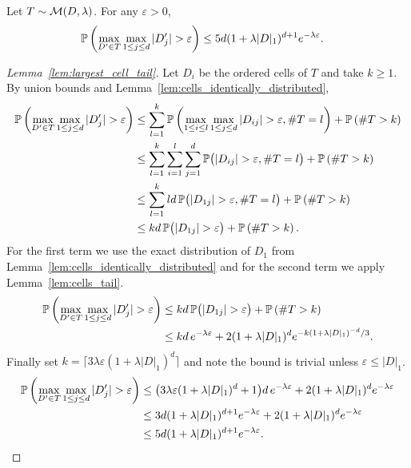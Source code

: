 \begin{lemma}
  \label{lem:largest_cell_tail}

  Let $T \sim \cM(D, \lambda)$.
  For any $\varepsilon > 0$,
  \begin{align*}
    \P\left(
      \max_{D' \in T}
      \max_{1 \leq j \leq d}
      |D'_j| > \varepsilon
    \right)
    &\leq
    5d (1 + \lambda |D|_1)^{d+1}
    e^{-\lambda \varepsilon}.
  \end{align*}
\end{lemma}

\begin{proof}[Lemma~\ref{lem:largest_cell_tail}]

  Let $D_i$ be the ordered cells of $T$ and take $k \geq 1$.
  By union bounds and Lemma~\ref{lem:cells_identically_distributed},
  \begin{align*}
    \P\left(
      \max_{D' \in T}
      \max_{1 \leq j \leq d}
      |D'_j| > \varepsilon
    \right)
    &\leq
    \sum_{l=1}^k
    \P\left(
      \max_{1 \leq i \leq l}
      \max_{1 \leq j \leq d}
      |D_{i j}| > \varepsilon,
      \# T = l
    \right)
    + \P\left( \# T > k \right) \\
    &\leq
    \sum_{l=1}^k
    \sum_{i=1}^l
    \sum_{j=1}^d
    \P\big(
      |D_{i j}| > \varepsilon,
      \# T = l
    \big)
    + \P\left( \# T > k \right) \\
    &\leq
    \sum_{l=1}^k
    l d \,
    \P\big(
      |D_{1j}| > \varepsilon,
      \# T = l
    \big)
    + \P\left( \# T > k \right) \\
    &\leq
    k d \,
    \P\big(|D_{1 j}| > \varepsilon \big)
    + \P\left( \# T > k \right).
  \end{align*}
  For the first term we use the exact distribution of
  $D_1$ from Lemma~\ref{lem:cells_identically_distributed}
  and for the second term we apply Lemma~\ref{lem:cells_tail}.
  \begin{align*}
    \P\left(
      \max_{D' \in T}
      \max_{1 \leq j \leq d}
      |D'_j| > \varepsilon
    \right)
    &\leq
    k d \, \P\big(|D_{1 j}| > \varepsilon \big)
    + \P\left( \# T > k \right) \\
    &\leq
    k d \, e^{-\lambda \varepsilon}
    + 2 (1 + \lambda |D|_1)^d
    e^{-k (1 + \lambda |D|_1)^{-d} / 3}.
  \end{align*}
  Finally set
  $k = \big\lceil 3 \lambda \varepsilon (1 + \lambda |D|_1)^d \big\rceil$
  and note the bound is trivial unless $\varepsilon \leq |D|_1$.
  \begin{align*}
    \P\left(
      \max_{D' \in T}
      \max_{1 \leq j \leq d}
      |D'_j| > \varepsilon
    \right)
    &\leq
    \big( 3 \lambda \varepsilon (1 + \lambda |D|_1)^d + 1 \big)
    d \, e^{-\lambda \varepsilon}
    + 2 (1 + \lambda |D|_1)^d
    e^{-\lambda \varepsilon} \\
    &\leq
    3d (1 + \lambda |D|_1)^{d+1}
    e^{-\lambda \varepsilon}
    + 2 (1 + \lambda |D|_1)^d
    e^{-\lambda \varepsilon} \\
    &\leq
    5d (1 + \lambda |D|_1)^{d+1}
    e^{-\lambda \varepsilon}.
  \end{align*}
\end{proof}

